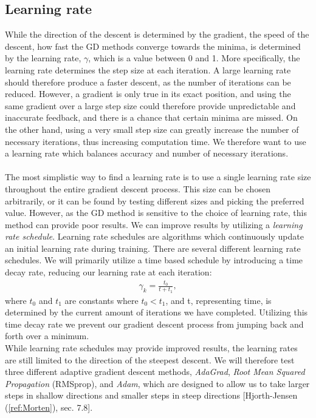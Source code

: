 \documentclass[english,notitlepage,reprint,nofootinbib]{revtex4-1}  %
\begin{document}
\subsection{Learning rate}
While the direction of the descent is determined by the gradient, the speed of the descent, how fast the GD methods converge towards the minima, is determined by the learning rate, $\gamma$, which is a value between 0 and 1. More specifically, the learning rate determines the step size at each iteration. A large learning rate should therefore produce a faster descent, as the number of iterations can be reduced. However, a gradient is only true in its exact position, and using the same gradient over a large step size could therefore provide unpredictable and inaccurate feedback, and there is a chance that certain minima are missed.
On the other hand, using a very small step size can greatly increase the number of necessary iterations, thus increasing computation time. We therefore want to use a learning rate which balances accuracy and number of necessary iterations. %
\\
\\
The most simplistic way to find a learning rate is to use a single learning rate size throughout the entire gradient descent process. This size can be chosen arbitrarily, or it can be found by testing different sizes and picking the preferred value. However, as the GD method is sensitive to the choice of learning rate, this method can provide poor results. We can improve results by utilizing a \textit{learning rate schedule}. Learning rate schedules are algorithms which continuously update an initial learning rate during training. There are several different learning rate schedules. %
We will primarily utilize a time based schedule by introducing a time decay rate, reducing our learning rate at each iteration:
\begin{align}
    \gamma_{k} = \frac{t_{0}}{t + t_{1}},
\end{align}
where $t_{0}$ and $t_{1}$ are constants where $t_{0} < t_{1}$, and t, representing time, is determined by the current amount of iterations we have completed. %
Utilizing this time decay rate we prevent our gradient descent process from jumping back and forth over a minimum.
\\

While learning rate schedules may provide improved results, the learning rates  are still %
limited to the direction of the steepest descent. We will therefore test %
three different adaptive gradient descent methods, \textit{AdaGrad}, \textit{Root Mean Squared Propagation} (RMSprop), and \textit{Adam}, which are designed to allow us to take larger steps in shallow directions and smaller steps in steep directions [Hjorth-Jensen (\ref{ref:Morten}), sec. 7.8]. %
\\
\end{document}
